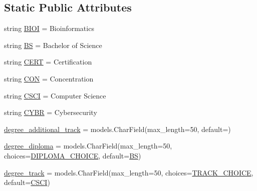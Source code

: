 \subsection*{Static Public Attributes}
\begin{DoxyCompactItemize}
\item 
string \mbox{\hyperlink{classmavAgenda_1_1landing_1_1models_1_1Degree_ab8fae6c0bef1560ac8435e4d6c555a3a}{B\+I\+OI}} = \textquotesingle{}Bioinformatics\textquotesingle{}
\item 
string \mbox{\hyperlink{classmavAgenda_1_1landing_1_1models_1_1Degree_ac78267af5ecd7a08c46f236368bf0fff}{BS}} = \textquotesingle{}Bachelor of Science\textquotesingle{}
\item 
string \mbox{\hyperlink{classmavAgenda_1_1landing_1_1models_1_1Degree_a1862aca77b271f6f77683805d2a40c1b}{C\+E\+RT}} = \textquotesingle{}Certification\textquotesingle{}
\item 
string \mbox{\hyperlink{classmavAgenda_1_1landing_1_1models_1_1Degree_a536f0f7b54b22aa7b9abb389bef69ad3}{C\+ON}} = \textquotesingle{}Concentration\textquotesingle{}
\item 
string \mbox{\hyperlink{classmavAgenda_1_1landing_1_1models_1_1Degree_aa1c9040b53d9c37bfebe6ba1ecace359}{C\+S\+CI}} = \textquotesingle{}Computer Science\textquotesingle{}
\item 
string \mbox{\hyperlink{classmavAgenda_1_1landing_1_1models_1_1Degree_aee3f9b4ca74e673279d6d269fd58b809}{C\+Y\+BR}} = \textquotesingle{}Cybersecurity\textquotesingle{}
\item 
\mbox{\hyperlink{classmavAgenda_1_1landing_1_1models_1_1Degree_a8fc6c4652b2dfe1a65276673c799adb5}{degree\+\_\+additional\+\_\+track}} = models.\+Char\+Field(max\+\_\+length=50, default=\textquotesingle{}\textquotesingle{})
\item 
\mbox{\hyperlink{classmavAgenda_1_1landing_1_1models_1_1Degree_a439cd68a3a2d41c58009c655d115de5a}{degree\+\_\+diploma}} = models.\+Char\+Field(max\+\_\+length=50, choices=\mbox{\hyperlink{classmavAgenda_1_1landing_1_1models_1_1Degree_a3ff221c690ef27bb964e725770d3bc9f}{D\+I\+P\+L\+O\+M\+A\+\_\+\+C\+H\+O\+I\+CE}}, default=\mbox{\hyperlink{classmavAgenda_1_1landing_1_1models_1_1Degree_ac78267af5ecd7a08c46f236368bf0fff}{BS}})
\item 
\mbox{\hyperlink{classmavAgenda_1_1landing_1_1models_1_1Degree_a1c08e430a806acfa70e67afb8368ed15}{degree\+\_\+track}} = models.\+Char\+Field(max\+\_\+length=50, choices=\mbox{\hyperlink{classmavAgenda_1_1landing_1_1models_1_1Degree_a8f41a44472524786c537c409825c9946}{T\+R\+A\+C\+K\+\_\+\+C\+H\+O\+I\+CE}}, default=\mbox{\hyperlink{classmavAgenda_1_1landing_1_1models_1_1Degree_aa1c9040b53d9c37bfebe6ba1ecace359}{C\+S\+CI}})

\end{DoxyCompactItemize}
